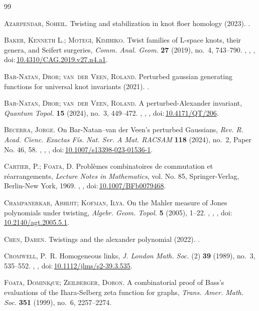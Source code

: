 \documentclass[11pt,hyp,]{nyjm}
\newcommand{\doi}[1]{doi:\,\href{http://dx.doi.org/#1}{#1}}
\numberwithin{thm}{section}
\theoremstyle{definition}
\theoremstyle{remark}
\begin{document}
	\begin{thebibliography}{99}
		
		{\scshape Azarpendar, Soheil.} Twisting and stabilization in knot floer homology (2023).
		.
		
		{\scshape Baker, Kenneth L.; Motegi, Kimihiko.} Twist families of {L}-space knots,
			their genera, and {S}eifert surgeries, \emph{Comm. Anal. Geom.} \textbf{27} (2019),
		no.~4, 743--790. , , , \doi{10.4310/CAG.2019.v27.n4.a1}.
		
		{\scshape Bar-Natan, Dror; van~der Veen, Roland.} Perturbed gaussian generating
			functions for universal knot invariants (2021). .
		
		{\scshape Bar-Natan, Dror; van~der Veen, Roland.} A perturbed-{A}lexander
			invariant, \emph{Quantum Topol.} \textbf{15} (2024), no.~3, 449--472. , , , \doi{10.4171/QT/206}.
		
		{\scshape Becerra, Jorge.} On {B}ar-{N}atan--van der {V}een's perturbed {G}aussians,
		\emph{Rev. R. Acad. Cienc. Exactas F\'is. Nat. Ser. A Mat. RACSAM} \textbf{118}
		(2024), no.~2, Paper No. 46, 58. , , , \doi{10.1007/s13398-023-01536-1}.
		
		{\scshape Cartier, P.; Foata, D.} Probl\`emes combinatoires de commutation et
			r\'{e}arrangements, \emph{Lecture Notes in Mathematics}, vol. No. 85,
		Springer-Verlag, Berlin-New York, 1969. , , \doi{10.1007/BFb0079468}.
		
		{\scshape Champanerkar, Abhijit; Kofman, Ilya.} On the {M}ahler measure of {J}ones
			polynomials under twisting, \emph{Algebr. Geom. Topol.} \textbf{5} (2005), 1--22.
		, , , \doi{10.2140/agt.2005.5.1}.
		
		{\scshape Chen, Daren.} Twistings and the alexander polynomial (2022). .
		
		{\scshape Cromwell, P.~R.} Homogeneous links, \emph{J. London Math. Soc.} (2) \textbf{39}
		(1989), no.~3, 535--552. , , \doi{10.1112/jlms/s2-39.3.535}.
		
		{\scshape Foata, Dominique; Zeilberger, Doron.} A combinatorial proof of {B}ass's
			evaluations of the {I}hara-{S}elberg zeta function for graphs, \emph{Trans. Amer.
		Math. Soc.} \textbf{351} (1999), no.~6, 2257--2274. 
		

\end{thebibliography}
\end{document}

